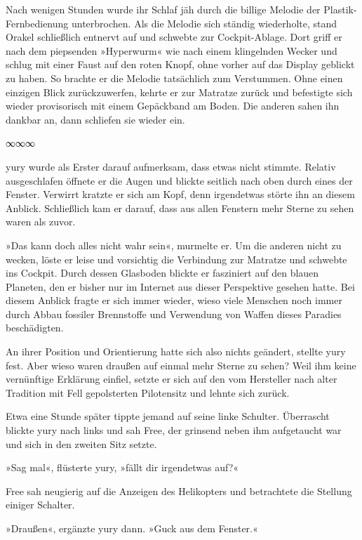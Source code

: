 Nach wenigen Stunden wurde ihr Schlaf jäh durch die billige Melodie der Plastik-Fernbedienung unterbrochen. Als die Melodie sich ständig wiederholte, stand Orakel schließlich entnervt auf und schwebte zur Cockpit-Ablage. Dort griff er nach dem piepsenden »Hyperwurm« wie nach einem klingelnden Wecker und schlug mit einer Faust auf den roten Knopf, ohne vorher auf das Display geblickt zu haben. So brachte er die Melodie tatsächlich zum Verstummen. Ohne einen einzigen Blick zurückzuwerfen, kehrte er zur Matratze zurück und befestigte sich wieder provisorisch mit einem Gepäckband am Boden. Die anderen sahen ihn dankbar an, dann schliefen sie wieder ein.

\begin{center}
    ∞∞∞
\end{center}

yury wurde als Erster darauf aufmerksam, dass etwas nicht stimmte. Relativ ausgeschlafen öffnete er die Augen und blickte seitlich nach oben durch eines der Fenster. Verwirrt kratzte er sich am Kopf, denn irgendetwas störte ihn an diesem Anblick. Schließlich kam er darauf, dass aus allen Fenstern mehr Sterne zu sehen waren als zuvor.

»Das kann doch alles nicht wahr sein«, murmelte er. Um die anderen nicht zu wecken, löste er leise und vorsichtig die Verbindung zur Matratze und schwebte ins Cockpit. Durch dessen Glasboden blickte er fasziniert auf den blauen Planeten, den er bisher nur im Internet aus dieser Perspektive gesehen hatte. Bei diesem Anblick fragte er sich immer wieder, wieso viele Menschen noch immer durch Abbau fossiler Brennstoffe und Verwendung von Waffen dieses Paradies beschädigten.

An ihrer Position und Orientierung hatte sich also nichts geändert, stellte yury fest. Aber wieso waren draußen auf einmal mehr Sterne zu sehen? Weil ihm keine vernünftige Erklärung einfiel, setzte er sich auf den vom Hersteller nach alter Tradition mit Fell gepolsterten Pilotensitz und lehnte sich zurück.

Etwa eine Stunde später tippte jemand auf seine linke Schulter. Überrascht blickte yury nach links und sah Free, der grinsend neben ihm aufgetaucht war und sich in den zweiten Sitz setzte.

»Sag mal«, flüsterte yury, »fällt dir irgendetwas auf?«

Free sah neugierig auf die Anzeigen des Helikopters und betrachtete die Stellung einiger Schalter.

»Draußen«, ergänzte yury dann. »Guck aus dem Fenster.«


